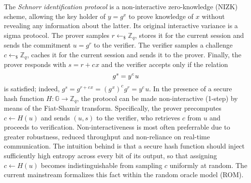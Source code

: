 \documentclass[10pt, psamsfonts, reqno]{amsart}
\theoremstyle{definition}
\theoremstyle{remark}
\numberwithin{equation}{section}
\begin{document}
The \textit{Schnorr identification protocol}
is a non-interactive zero-knowledge (NIZK) scheme,
allowing the key holder of $y = g ^ x$
to prove knowledge of $x$
without revealing any information about the latter.
Its original interactive variance \cite{paper_schnorr} is a sigma protocol.
The prover samples $r \leftarrow_\$ \mathbb{Z}_q$,
stores it for the current session
and sends the commitment $u = g ^ r$ to the verifier.
The verifier samples a challenge $c \leftarrow_\$ \mathbb{Z}_q$,
caches it for the current session and sends it to the prover.
Finally, the prover responds with $s = r + c\hspace{1pt}x$
and the verifier accepts only if the relation
\vspace{5pt}
\begin{equation*}
g ^ s = y ^ c\hspace{1pt}u
\vspace{5pt}
\end{equation*}
is satisfied; indeed,
$g^s=g^{r + c\hspace{1pt}x}
=(g^{\hspace{1pt}x})^c\hspace{1pt}g^r
=y^c\hspace{1pt}u$.
In the presence of a secure hash function
$H: \mathbb{G} \rightarrow \mathbb{Z}_q$,
the protocol can be made non-interactive (1-step)
by means of the Fiat-Shamir transform. Specifically,
the prover precomputes $c \leftarrow H(u)$
and sends $(u, s)$ to the verifier,
who retrieves $c$ from $u$ and proceeds
to verification.
Non-interactiveness is most often preferrable
due to greater robustness, reduced throughput
and non-reliance on real-time communication.
The intuition behind is that a secure hash function
should inject sufficiently high entropy
across every bit of its output,
so that assigning $c \leftarrow H(u)$
becomes indistinguishable from sampling $c$ uniformly at random.
The current mainstream formalizes this fact
within the random oracle model (ROM).
\end{document}
